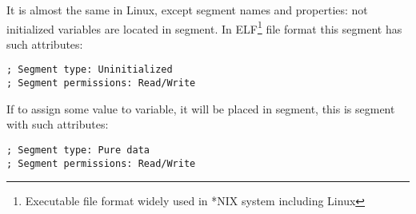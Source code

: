 {It is almost the same in Linux, except segment names and properties: 
not initialized variables are located in  segment. 
In ELF\footnote{Executable file format widely used in *NIX system including Linux} 
file format this segment has such attributes:}

\begin{lstlisting}
; Segment type: Uninitialized
; Segment permissions: Read/Write
\end{lstlisting}

{If to assign some value to variable, it will be placed in  segment, 
this is segment with such attributes:}

\begin{lstlisting}
; Segment type: Pure data
; Segment permissions: Read/Write
\end{lstlisting}



